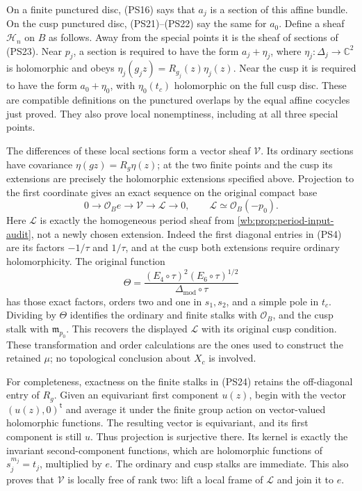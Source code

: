 On a finite punctured disc, (PS16) says that $a_j$ is a section of
this affine bundle. On the cusp punctured disc, (PS21)--(PS22) say
the same for $a_0$. Define a sheaf $\mathscr H_n$ on $B$ as follows.
Away from the special points it is the sheaf of sections of (PS23).
Near $p_j$, a section is required to have the form $a_j+\eta_j$,
where $\eta_j:\Delta_j\to\mathbb C^2$ is holomorphic and obeys
$\eta_j(g_jz)=R_{g_j}(z)\eta_j(z)$. Near the cusp it is required
to have the form $a_0+\eta_0$, with $\eta_0(t_c)$ holomorphic on
the full cusp disc. These are compatible definitions on the punctured
overlaps by the equal affine cocycles just proved. They also prove
local nonemptiness, including at all three special points.

The differences of these local sections form a vector sheaf
$\mathscr V$. Its ordinary sections have covariance $\eta(gz)=R_g\eta(z)$;
at the two finite points and the cusp its extensions are precisely
the holomorphic extensions specified above. Projection to the first
coordinate gives an exact sequence on the original compact base
\[
 0\longrightarrow\mathcal O_B e\longrightarrow\mathscr V
        \longrightarrow\mathcal L\longrightarrow0,
                  \qquad \mathcal L\simeq\mathcal O_B(-p_0).
 \tag{PS24}\label{wb:pshift:eq:vector-sheaf}
\]
Here $\mathcal L$ is exactly the homogeneous period sheaf from
\cref{wb:prop:period-input-audit}, not a newly chosen extension. Indeed
the first diagonal entries in (PS4) are its factors $-1/\tau$ and
$1/\tau$, and at the cusp both extensions require ordinary
holomorphicity. The original function
\[
 \Theta=\frac{(E_4\circ\tau)^2(E_6\circ\tau)^{1/2}}
                 {\Delta_{\mathrm{mod}}\circ\tau}
\]
has those exact factors, orders two and one in $s_1,s_2$, and a
simple pole in $t_c$. Dividing by $\Theta$ identifies the ordinary
and finite stalks with $\mathcal O_B$, and the cusp stalk with
$\mathfrak m_{p_0}$. This recovers the displayed $\mathcal L$
with its original cusp condition. These transformation and order
calculations are the ones used to construct the retained $\mu$;
no topological conclusion about $X_c$ is involved.

For completeness, exactness on the finite stalks in (PS24) retains
the off-diagonal entry of $R_g$. Given an equivariant first component
$u(z)$, begin with the vector $(u(z),0)^{\mathsf t}$ and average it
under the finite group action on vector-valued holomorphic functions.
The resulting vector is equivariant, and its first component is
still $u$. Thus projection is surjective there. Its kernel is
exactly the invariant second-component functions, which are
holomorphic functions of $s_j^{m_j}=t_j$, multiplied by $e$.
The ordinary and cusp stalks are immediate. This also proves that
$\mathscr V$ is locally free of rank two: lift a local frame of
$\mathcal L$ and join it to $e$.

